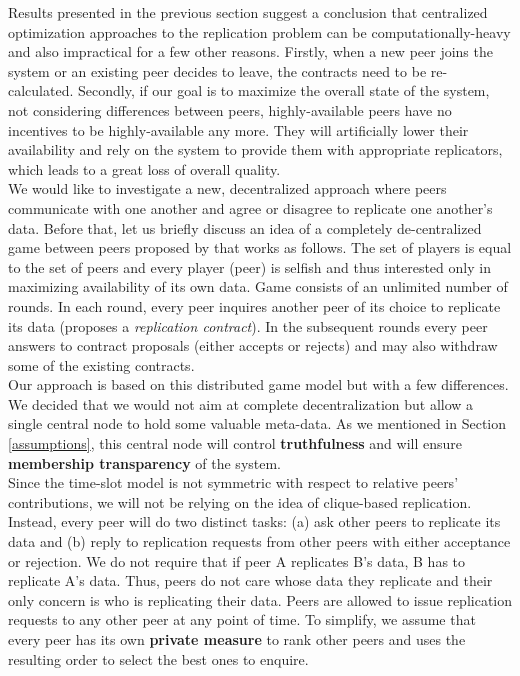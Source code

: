\documentclass{pracamgren}
\begin{document}
Results presented in the previous section suggest a conclusion that centralized optimization approaches to the replication problem can be computationally-heavy and also impractical for a few other reasons. Firstly, when a new peer joins the system or an existing peer decides to leave, the contracts need to be re-calculated. Secondly, if our goal is to maximize the overall state of the system, not considering differences between peers, highly-available peers have no incentives to be highly-available any more. They will artificially lower their availability and rely on the system to provide them with appropriate replicators, which leads to a great loss of overall quality.\\

We would like to investigate a new, decentralized approach where peers communicate with one another and agree or disagree to replicate one another's data. Before that, let us briefly discuss an idea of a completely de-centralized game between peers proposed by \cite{krz} that works as follows. The set of players is equal to the set of peers and every player (peer) is selfish and thus interested only in maximizing availability of its own data. Game consists of an unlimited number of rounds. In each round, every peer inquires another peer of its choice to replicate its data (proposes a {\it replication contract}). In the subsequent rounds every peer answers to contract proposals (either accepts or rejects) and may also withdraw some of the existing contracts.\\

Our approach is based on this distributed game model but with a few differences. We decided that we would not aim at complete decentralization but allow a single central node to hold some valuable meta-data. As we mentioned in Section \ref{assumptions}, this central node will control {\bf truthfulness} and will ensure {\bf membership transparency} of the system.\\

Since the time-slot model is not symmetric with respect to relative peers' contributions, we will not be relying on the idea of clique-based replication. Instead, every peer will do two distinct tasks: (a) ask other peers to replicate its data and (b) reply to replication requests from other peers with either acceptance or rejection. We do not require that if peer A replicates B's data, B has to replicate A's data. Thus, peers do not care whose data they replicate and their only concern is who is replicating their data. Peers are allowed to issue replication requests to any other peer at any point of time. To simplify, we assume that every peer has its own {\bf private measure} to rank other peers and uses the resulting order to select the best ones to enquire.\\
\end{document}
